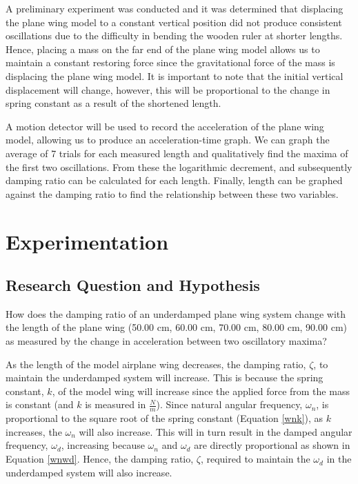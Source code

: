 \documentclass[12pt]{article}
\begin{document}
A preliminary experiment was conducted and it was determined that displacing the plane wing model to a constant vertical position did not produce consistent oscillations due to the difficulty in bending the wooden ruler at shorter lengths. Hence, placing a mass on the far end of the plane wing model allows us to maintain a constant restoring force since the gravitational force of the mass is displacing the plane wing model. It is important to note that the initial vertical displacement will change, however, this will be proportional to the change in spring constant as a result of the shortened length. 

A motion detector will be used to record the acceleration of the plane wing model, allowing us to produce an acceleration-time graph. We can graph the average of 7 trials for each measured length and qualitatively find the maxima of the first two oscillations. From these the logarithmic decrement, and subsequently damping ratio can be calculated for each length. Finally, length can be graphed against the damping ratio to find the relationship between these two variables. 


\section{Experimentation}
\subsection{Research Question and Hypothesis}

How does the damping ratio of an underdamped plane wing system change with the length of the plane wing (50.00 cm, 60.00 cm, 70.00 cm, 80.00 cm, 90.00 cm) as measured by the change in acceleration between two oscillatory maxima? 

As the length of the model airplane wing decreases, the damping ratio, $\zeta$, to maintain the underdamped system will increase. This is because the spring constant, $k$, of the model wing will increase since the applied force from the mass is constant (and $k$ is measured in $\frac{N}{m}$). Since natural angular frequency, $\omega_n$, is proportional to the square root of the spring constant (Equation \ref{wnk}), as $k$ increases, the $\omega_n$ will also increase. This will in turn result in the damped angular frequency, $\omega_d$, increasing because $\omega_n$ and $\omega_d$ are directly proportional as shown in Equation \ref{wnwd}. Hence, the damping ratio, $\zeta$, required to maintain the $\omega_d$ in the underdamped system will also increase. 
\end{document}
